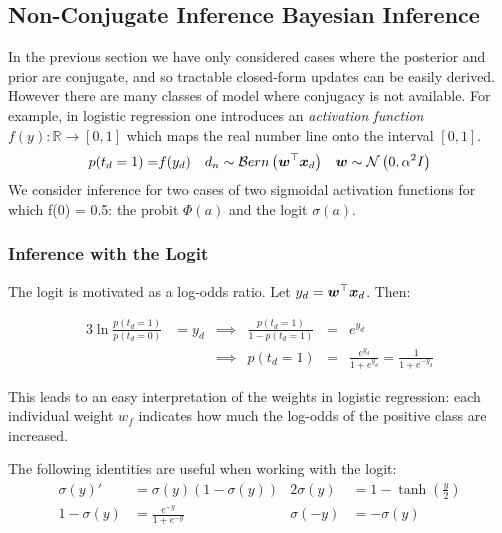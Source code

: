 


\subsection{Non-Conjugate Inference Bayesian Inference}
\label{sec:nonconj}
In the previous section we have only considered cases where the posterior and prior are conjugate, and so tractable closed-form updates can be easily derived. However there are many classes of model where conjugacy is not available. For example, in logistic regression one introduces an \emph{activation function} $f(y) : \mathbb{R} \rightarrow [0, 1]$ which maps the real number line onto the interval $[0,1]$.
\begin{align*}
p(t_d = 1) = & f(y_d) & d_n  & \sim \mathcal{B}ern \left( \bm w^\top\bm x_d\right) & \bm w & \sim \mathcal{N} \left( {0}, {\alpha^2 I} \right) \\
\end{align*}
We consider inference for two cases of two sigmoidal activation functions for which f(0) = 0.5: the probit $\Phi(a)$ and the logit $\sigma(a)$.

\subsubsection{Inference with the Logit}
The logit is motivated as a log-odds ratio. Let $y_d = \bm w^\top\bm x_d$. Then:

\begin{alignat}{3}
\ln \frac{p(t_d = 1)}{p(t_d = 0)}  & = y_d  &
\implies & \frac{p(t_d = 1)}{1 - p(t_d = 1)}  & = & e^{y_d} \\
& & \implies &  p(t_d = 1)                    & = & \frac{e^{y_d}}{1 + e^{y_d}} = \frac{1}{1+e^{-y_d}}
\end{alignat}

This leads to an easy interpretation of the weights in logistic regression: each individual weight $w_f$ indicates how much the log-odds of the positive class are increased.

The following identities are useful when working with the logit:
\begin{align}
\sigma(y)' & = \sigma(y)(1 - \sigma(y)) \label{eqn:sigma-identity} &
2 \sigma(y) & = 1 - \tanh (\frac{y}{2}) \\
1 - \sigma(y) & = \frac{e^{-y}}{1 + e^{-y}} &
\sigma(-y) & = -\sigma(y)
\end{align}


